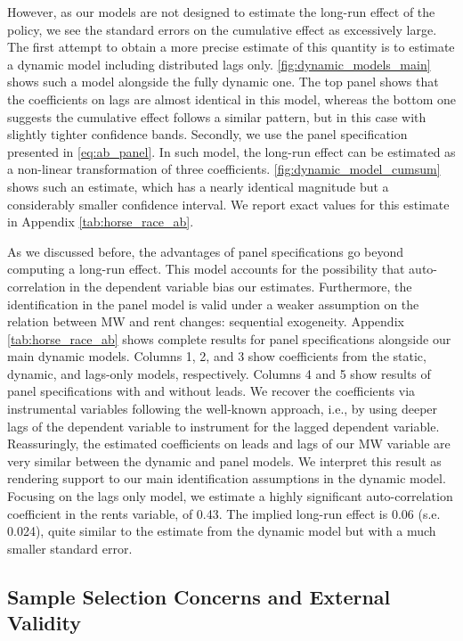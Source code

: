 However, as our models are not designed to estimate the long-run effect of the policy, we see 
the standard errors on the cumulative effect as excessively large. The first attempt to obtain 
a more precise estimate of this quantity is to estimate a dynamic model including distributed 
lags only. \autoref{fig:dynamic_models_main} shows such a model alongside the fully dynamic one. 
The top panel shows that the coefficients on lags are almost identical in this model, whereas 
the bottom one suggests the cumulative effect follows a similar pattern, but in this case with 
slightly tighter confidence bands. Secondly, we use the panel specification presented in 
\autoref{eq:ab_panel}. In such model, the long-run effect can be estimated as a non-linear 
transformation of three coefficients. \autoref{fig:dynamic_model_cumsum} shows such an estimate, 
which has a nearly identical magnitude but a considerably smaller confidence interval. We report 
exact values for this estimate in Appendix \autoref{tab:horse_race_ab}.

As we discussed before, the advantages of panel specifications go beyond computing a long-run 
effect. This model accounts for the possibility that auto-correlation in the dependent variable 
bias our estimates. Furthermore, the identification in the panel model is valid under a weaker 
assumption on the relation between MW and rent changes: sequential exogeneity. Appendix 
\autoref{tab:horse_race_ab} shows complete results for panel specifications alongside our main 
dynamic models. Columns 1, 2, and 3 show coefficients from the static, dynamic, and lags-only 
models, respectively. Columns 4 and 5 show results of panel specifications with and without 
leads. We recover the coefficients via instrumental variables following the well-known 
\textcite{ArellanoBond1991} approach, i.e., by using deeper lags of the dependent variable to 
instrument for the lagged dependent variable. Reassuringly, the estimated coefficients on leads 
and lags of our MW variable are very similar between the dynamic and panel models. We interpret 
this result as rendering support to our main identification assumptions in the dynamic model. 
Focusing on the lags only model, we estimate a highly significant auto-correlation coefficient 
in the rents variable, of 0.43. The implied long-run effect is 0.06 (s.e. 0.024), quite similar
to the estimate from the dynamic model but with a much smaller standard error.


\subsection{Sample Selection Concerns and External Validity}\label{sec:sample_rest}

